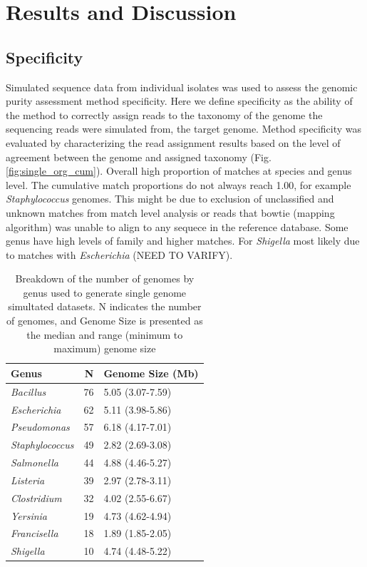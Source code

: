 \documentclass[fleqn,10pt,lineno]{wlpeerj}\usepackage[]{graphicx}\usepackage[]{color}
\begin{document}
\section*{Results and Discussion}

\subsection*{Specificity}

Simulated sequence data from individual isolates was used to assess the genomic purity assessment method specificity.  
Here we define specificity as the ability of the method to correctly assign reads to the taxonomy of the genome the sequencing reads were simulated from, the target genome. 
Method specificity was evaluated by characterizing the read assignment results based on the level of agreement between the genome and assigned taxonomy (Fig. \ref{fig:single_org_cum}). 
Overall high proportion of matches at species and genus level. 
The cumulative match proportions do not always reach 1.00, for example \textit{Staphylococcus} genomes. 
This might be due to exclusion of unclassified and unknown matches from match level analysis or reads that bowtie (mapping algorithm) was unable to align to any sequece in the reference database. 
Some genus have high levels of family and higher matches. 
For \textit{Shigella} most likely due to matches with \textit{Escherichia} (NEED TO VARIFY). 

\begin{table}[ht]
\centering
\begin{tabular}{lrl}
  \hline
Genus & N & Genome Size (Mb) \\ 
  \hline
\textit{Bacillus} &  76 & 5.05 (3.07-7.59) \\ 
  \textit{Escherichia} &  62 & 5.11 (3.98-5.86) \\ 
  \textit{Pseudomonas} &  57 & 6.18 (4.17-7.01) \\ 
  \textit{Staphylococcus} &  49 & 2.82 (2.69-3.08) \\ 
  \textit{Salmonella} &  44 & 4.88 (4.46-5.27) \\ 
  \textit{Listeria} &  39 & 2.97 (2.78-3.11) \\ 
  \textit{Clostridium} &  32 & 4.02 (2.55-6.67) \\ 
  \textit{Yersinia} &  19 & 4.73 (4.62-4.94) \\ 
  \textit{Francisella} &  18 & 1.89 (1.85-2.05) \\ 
  \textit{Shigella} &  10 & 4.74 (4.48-5.22) \\ 
   \hline
\end{tabular}
\caption{Breakdown of the number of genomes by genus used to generate single genome simultated datasets. N indicates the number of genomes, and Genome Size is presented as the median and range (minimum to maximum) genome size} 
\label{tab:single_org}
\end{table}
\end{document}
